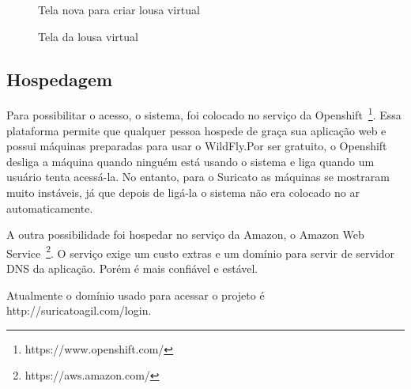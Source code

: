 \begin{figure}[H]
  \centering
  \caption{Tela nova para criar lousa virtual}\label{figura:criarNovo}
\end{figure}

\begin{figure}[H]
  \centering
  \caption{Tela da lousa virtual}\label{figura:Retrospectiva}
\end{figure}

\subsection{Hospedagem}

Para possibilitar o acesso, o sistema, foi colocado no serviço da Openshift~\footnote{https://www.openshift.com/}. Essa plataforma permite que qualquer pessoa hospede de graça sua aplicação web e possui máquinas preparadas para usar o WildFly.Por ser gratuito, o Openshift desliga a máquina quando ninguém está usando o sistema e liga quando um usuário tenta acessá-la. No entanto, para o Suricato as máquinas se mostraram muito instáveis, já que depois de ligá-la o sistema não era colocado no ar automaticamente. 

A outra possibilidade foi hospedar no serviço da Amazon, o Amazon Web Service~\footnote{https://aws.amazon.com/}. O serviço exige um custo extras e um domínio para servir de servidor DNS da aplicação. Porém é mais confiável e estável.

Atualmente o domínio usado para acessar o projeto é http://suricatoagil.com/login.